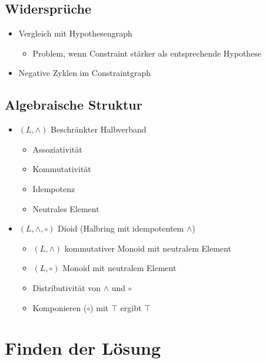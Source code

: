 \documentclass[hyperref={pdfpagelabels=false}]{beamer}
\newcommand{\meet}{\wedge}
\newcommand{\compose}{\circ}
\begin{document}
\subsection{Widersprüche}
\label{cont}
\begin{frame}
	\begin{itemize}
		\item Vergleich mit Hypothesengraph
			\begin{itemize}
				\item Problem, wenn Constraint stärker als entsprechende Hypothese
			\end{itemize}
		\item Negative Zyklen im Constraintgraph
	\end{itemize}
\end{frame}
\subsection{Algebraische Struktur}
\label{alg}
\begin{frame}
	\begin{itemize}
		\item
			\begin{block}{$(L,\wedge)$ Beschränkter Halbverband}
				\begin{itemize}
					\item Assoziativität
					\item Kommutativität
					\item Idempotenz
					\item Neutrales Element
				\end{itemize}
			\end{block}
		\item
			\begin{block}{$(L,\wedge,\compose)$ Dioid (Halbring mit idempotentem $\meet$)}
				\begin{itemize}
					\item $(L,\wedge)$ kommutativer Monoid mit neutralem Element
					\item $(L,\compose)$ Monoid mit neutralem Element
					\item Distributivität von $\meet$ und $\compose$
					\item Komponieren ($\compose$) mit $\top$ ergibt $\top$
				\end{itemize}
			\end{block}
	\end{itemize}
\end{frame}
\section{Finden der Lösung}
\label{sol}
\end{document}
